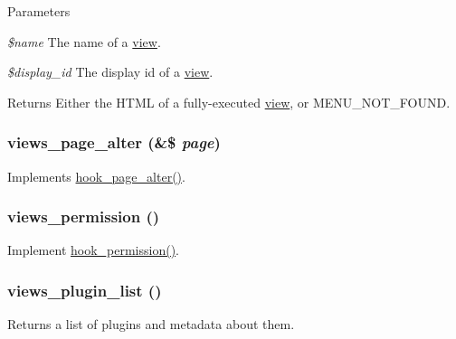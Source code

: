 \begin{DoxyParams}{Parameters}
\item[{\em \$name}]The name of a \hyperlink{classview}{view}. \item[{\em \$display\_\-id}]The display id of a \hyperlink{classview}{view}.\end{DoxyParams}
\begin{DoxyReturn}{Returns}
Either the HTML of a fully-\/executed \hyperlink{classview}{view}, or MENU\_\-NOT\_\-FOUND. 
\end{DoxyReturn}
\hypertarget{views_8module_a278afcd00ca124837da7016ede4e64b2}{
\subsubsection[{views\_\-page\_\-alter}]{\setlength{\rightskip}{0pt plus 5cm}views\_\-page\_\-alter (\&\$ {\em page})}}
\label{views_8module_a278afcd00ca124837da7016ede4e64b2}
Implements \hyperlink{group__hooks_gaa965aa8f38b48aed1a19c556c199145f}{hook\_\-page\_\-alter()}. \hypertarget{views_8module_a0d62d027dd49788bfa55b9011c0af70f}{
\subsubsection[{views\_\-permission}]{\setlength{\rightskip}{0pt plus 5cm}views\_\-permission ()}}
\label{views_8module_a0d62d027dd49788bfa55b9011c0af70f}
Implement \hyperlink{group__hooks_ga2b22b45f4925f2478412477bae329713}{hook\_\-permission()}. \hypertarget{views_8module_a29c38bcb5187337aaa3fa82750bb67b9}{
\subsubsection[{views\_\-plugin\_\-list}]{\setlength{\rightskip}{0pt plus 5cm}views\_\-plugin\_\-list ()}}
\label{views_8module_a29c38bcb5187337aaa3fa82750bb67b9}
Returns a list of plugins and metadata about them.

